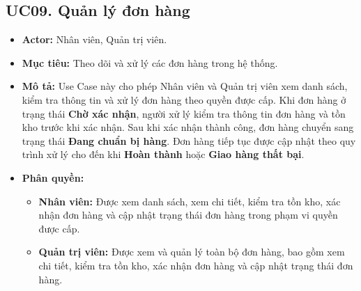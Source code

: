 \documentclass[12pt,a4paper]{article}
\begin{document}

\subsection{UC09. Quản lý đơn hàng}

\begin{itemize}

\item \textbf{Actor:} Nhân viên, Quản trị viên.

\item \textbf{Mục tiêu:} Theo dõi và xử lý các đơn hàng trong hệ thống.

\item \textbf{Mô tả:} Use Case này cho phép Nhân viên và Quản trị viên xem danh sách, kiểm tra thông tin và xử lý đơn hàng theo quyền được cấp. Khi đơn hàng ở trạng thái \textbf{Chờ xác nhận}, người xử lý kiểm tra thông tin đơn hàng và tồn kho trước khi xác nhận. Sau khi xác nhận thành công, đơn hàng chuyển sang trạng thái \textbf{Đang chuẩn bị hàng}. Đơn hàng tiếp tục được cập nhật theo quy trình xử lý cho đến khi \textbf{Hoàn thành} hoặc \textbf{Giao hàng thất bại}.

\item \textbf{Phân quyền:}
\begin{itemize}
\item \textbf{Nhân viên:} Được xem danh sách, xem chi tiết, kiểm tra tồn kho, xác nhận đơn hàng và cập nhật trạng thái đơn hàng trong phạm vi quyền được cấp.
\item \textbf{Quản trị viên:} Được xem và quản lý toàn bộ đơn hàng, bao gồm xem chi tiết, kiểm tra tồn kho, xác nhận đơn hàng và cập nhật trạng thái đơn hàng.
\end{itemize}
\end{itemize}
\end{document}
